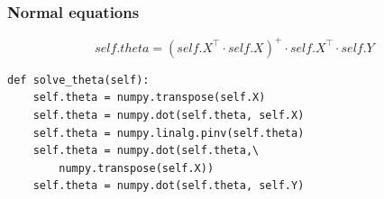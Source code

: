 \documentclass{beamer}
\begin{document}

\begin{frame}[fragile]
	\frametitle{Normal equations}
	\begin{equation}
		self.theta = (self.X^\intercal \cdot self.X)^{+} \cdot self.X^\intercal \cdot self.Y
		\nonumber
		\label{eq:solve-theta}
	\end{equation}
\begin{lstlisting}
def solve_theta(self):
    self.theta = numpy.transpose(self.X)
    self.theta = numpy.dot(self.theta, self.X)
    self.theta = numpy.linalg.pinv(self.theta)
    self.theta = numpy.dot(self.theta,\
        numpy.transpose(self.X))
    self.theta = numpy.dot(self.theta, self.Y)
\end{lstlisting}
\end{frame}
\setcounter{framenumber}{\value{finalframe}}
\end{document}
